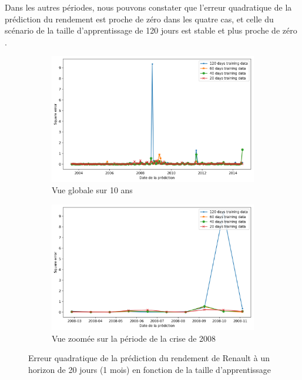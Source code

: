 Dans les autres périodes, nous pouvons constater que l'erreur quadratique de la prédiction du rendement est proche de zéro dans les quatre cas, et celle du scénario de la taille d'apprentissage de 120 jours est stable et plus proche de zéro .

\begin{figure}[H]
\centering
\begin{subfigure}{.5\textwidth}
\centering
\includegraphics[width=.9\linewidth, scale=0.2]
{plot/SE_Trainingset.png}
\caption{Vue globale sur 10 ans}
\label{fig:SE_Ts1}
\end{subfigure}%
\begin{subfigure}{.5\textwidth}
\centering
\includegraphics[width=.9\linewidth, scale=0.2]
{plot/SE_Trainingset_s.png}
\caption{Vue zoomée sur la période de la crise de 2008}
\label{fig:SE_Ts2}
\end{subfigure}
\caption{Erreur quadratique de la prédiction du rendement de Renault à un horizon de 20 jours (1 mois) en fonction de la taille d'apprentissage}
\label{fig:SE_Trainingset}
\end{figure}


